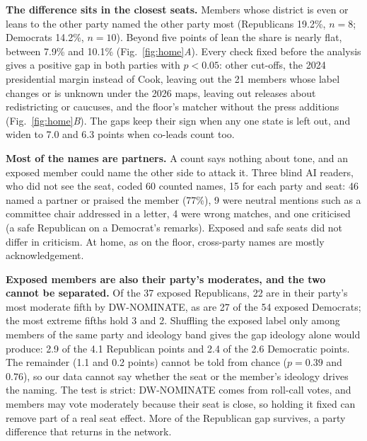 \textbf{The difference sits in the closest seats.} Members whose district is even or leans to the other party named the other party most (Republicans 19.2\%, $n = 8$; Democrats 14.2\%, $n = 10$). Beyond five points of lean the share is nearly flat, between 7.9\% and 10.1\% (Fig.~\ref{fig:home}\emph{A}). Every check fixed before the analysis gives a positive gap in both parties with $p < 0.05$: other cut-offs, the 2024 presidential margin instead of Cook, leaving out the 21 members whose label changes or is unknown under the 2026 maps, leaving out releases about redistricting or caucuses, and the floor's matcher without the press additions (Fig.~\ref{fig:home}\emph{B}). The gaps keep their sign when any one state is left out, and widen to 7.0 and 6.3 points when co-leads count too.

\textbf{Most of the names are partners.} A count says nothing about tone, and an exposed member could name the other side to attack it. Three blind AI readers, who did not see the seat, coded 60 counted names, 15 for each party and seat: 46 named a partner or praised the member (77\%), 9 were neutral mentions such as a committee chair addressed in a letter, 4 were wrong matches, and one criticised (a safe Republican on a Democrat's remarks). Exposed and safe seats did not differ in criticism. At home, as on the floor, cross-party names are mostly acknowledgement.

\textbf{Exposed members are also their party's moderates, and the two cannot be separated.} Of the 37 exposed Republicans, 22 are in their party's most moderate fifth by DW-NOMINATE, as are 27 of the 54 exposed Democrats; the most extreme fifths hold 3 and 2. Shuffling the exposed label only among members of the same party and ideology band gives the gap ideology alone would produce: 2.9 of the 4.1 Republican points and 2.4 of the 2.6 Democratic points. The remainder (1.1 and 0.2 points) cannot be told from chance ($p = 0.39$ and $0.76$), so our data cannot say whether the seat or the member's ideology drives the naming. The test is strict: DW-NOMINATE comes from roll-call votes, and members may vote moderately because their seat is close, so holding it fixed can remove part of a real seat effect. More of the Republican gap survives, a party difference that returns in the network.


